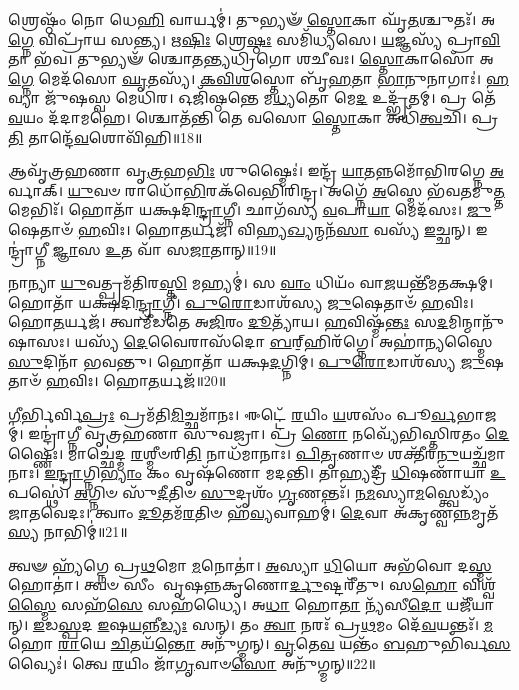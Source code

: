 𑌶𑍍𑌰𑍇𑌷𑍍𑌠𑌂᳴ 𑌨𑍋 𑌧𑍇\-\ul{𑌹𑌿} 𑌵𑌾𑌰𑍍𑌯𑌮𑍍॑।
𑌤𑍁𑌭𑍍𑌯𑍟᳴ \ul{𑌸𑍍𑌤𑍋}\-𑌕𑌾 𑌘𑍃᳴\-\ul{𑌤}\-𑌶𑍍𑌚𑍁𑌤𑌃᳴।
𑌅\-\ul{𑌗𑍍𑌨𑍇} 𑌵𑌿𑌪𑍍𑌰𑌾᳴𑌯 𑌸𑌨𑍍𑌤𑍍𑌯।
𑌋\-\ul{𑌷𑌿𑌃} 𑌶𑍍𑌰𑍇\-\ul{𑌷𑍍𑌠𑌃} 𑌸𑌮𑌿᳴𑌧𑍍𑌯𑌸𑍇।
\-\ul{𑌯}\-𑌜𑍍𑌞𑌸𑍍𑌯᳴ 𑌪𑍍𑌰𑌾\-\ul{𑌵𑌿}\-𑌤𑌾 𑌭᳴𑌵।
𑌤𑍁𑌭𑍍𑌯𑍟᳴ 𑌶𑍍𑌚𑍋𑌤𑌨𑍍𑌤𑍍𑌯𑌧𑍍𑌰𑌿𑌗𑍋 𑌶𑌚𑍀𑌵𑌃।
\-\ul{𑌸𑍍𑌤𑍋}\-𑌕𑌾𑌸𑍋᳴ 𑌅\-\ul{𑌗𑍍𑌨𑍇} 𑌮𑍇𑌦᳴𑌸𑍋 \ul{𑌘𑍃}\-𑌤𑌸𑍍𑌯᳴।
\-\ul{𑌕}\-\-\ul{𑌵𑌿}\-\-\ul{𑌶}\-𑌸𑍍𑌤𑍋 𑌬𑍃᳴\-\ul{𑌹}\-𑌤𑌾 \ul{𑌭𑌾}\-𑌨𑍁𑌨𑌾𑌗𑌾𑌃॑।
\-\ul{𑌹}\-𑌵𑍍𑌯𑌾 𑌜𑍁᳴𑌷𑌸𑍍𑌵 𑌮𑍇𑌧𑌿𑌰।
𑌓𑌜𑌿᳴𑌷𑍍𑌠𑌨𑍍𑌤𑍇 𑌮\-\ul{𑌧𑍍𑌯}\-𑌤𑍋 𑌮𑍇\-\ul{𑌦} 𑌉𑌦𑍍𑌭𑍃᳴𑌤𑌮𑍍।
𑌪𑍍𑌰 𑌤𑍇᳴ \ul{𑌵}\-𑌯𑌂 𑌦᳴𑌦𑌾𑌮𑌹𑍇।
𑌶𑍍𑌚𑍋𑌤᳴𑌨𑍍𑌤𑌿 𑌤𑍇 𑌵𑌸𑍋 \ul{𑌸𑍍𑌤𑍋}\-𑌕𑌾 𑌅𑌧𑌿᳴\-\ul{𑌤𑍍𑌵}\-𑌚𑌿।
𑌪𑍍𑌰\-\ul{𑌤𑌿} 𑌤𑌾𑌨𑍍𑌦𑍇᳴\-\ul{𑌵}\-𑌶𑍋𑌵𑌿᳴𑌹𑌿॥18॥\anuvakamend[\-\ul{𑌦𑍇}\-𑌵𑌵𑍀᳴𑌤\-\ul{𑌯} 𑌉𑌦𑍍𑌭𑍃᳴\-\ul{𑌤}\-𑌨𑍍𑌤𑍍𑌰𑍀𑌣𑌿᳴ 𑌚]

𑌆𑌵𑍃᳴𑌤𑍍𑌰𑌹𑌣𑌾 𑌵𑍃\-\ul{𑌤𑍍𑌰}\-𑌹\-\ul{𑌭𑌿𑌃} 𑌶𑍁𑌷𑍍𑌮𑍈𑌃॑।
𑌇𑌨𑍍𑌦𑍍𑌰᳴ \ul{𑌯𑌾}\-𑌤𑌨𑍍𑌨𑌮𑍋᳴𑌭𑌿𑌰𑌗𑍍𑌨𑍇 \ul{𑌅}\-𑌰𑍍𑌵𑌾𑌕𑍍।
\-\ul{𑌯𑍁}\-𑌵𑍞 𑌰𑌾𑌧𑍋᳴\-\ul{𑌭𑌿}\-𑌰𑌕᳴𑌵𑍇𑌭𑌿𑌰𑌿𑌨𑍍𑌦𑍍𑌰।
𑌅𑌗𑍍𑌨𑍇᳴ \ul{𑌅}\-𑌸𑍍𑌮𑍇 𑌭᳴𑌵𑌤𑌮𑍁\-\ul{𑌤𑍍𑌤}\-𑌮𑍇𑌭𑌿𑌃᳴।
𑌹𑍋𑌤𑌾᳴ 𑌯𑌕𑍍𑌷𑌦𑌿\-\ul{𑌨𑍍𑌦𑍍𑌰𑌾}\-𑌗𑍍𑌨𑍀।
𑌛𑌾𑌗᳴𑌸𑍍𑌯 \ul{𑌵}\-𑌪𑌾\-\ul{𑌯𑌾} 𑌮𑍇𑌦᳴𑌸𑌃।
\-\ul{𑌜𑍁}\-𑌷𑍇𑌤𑌾𑍞᳴ \ul{𑌹}\-𑌵𑌿𑌃।
𑌹𑍋\-\ul{𑌤}\-𑌰𑍍𑌯𑌜᳴।
𑌵𑌿𑌹𑍍𑌯\-\ul{𑌖𑍍𑌯}\-𑌨𑍍𑌮𑌨᳴\-\ul{𑌸𑌾} 𑌵𑌸𑍍𑌯᳴ \ul{𑌇}\-𑌚𑍍𑌛𑌨𑍍।
𑌇𑌨𑍍𑌦𑍍𑌰𑌾॑𑌗𑍍𑌨𑍀 \ul{𑌜𑍍𑌞𑌾}\-𑌸 \ul{𑌉}\-𑌤 𑌵𑌾᳴ 𑌸\-\ul{𑌜𑌾}\-𑌤𑌾𑌨𑍍॥19॥

𑌨𑌾𑌨𑍍𑌯𑌾 \ul{𑌯𑍁}\-𑌵𑌤𑍍𑌪𑍍𑌰𑌮᳴𑌤𑌿𑌰\-\ul{𑌸𑍍𑌤𑌿} 𑌮𑌹𑍍𑌯𑌮𑍍॑।
𑌸 \ul{𑌵𑌾𑌂} 𑌧𑌿𑌯𑌂᳴ 𑌵𑌾\-\ul{𑌜}\-𑌯𑌨𑍍𑌤𑍀᳴𑌮𑌤𑌕𑍍𑌷𑌮𑍍।
𑌹𑍋𑌤𑌾᳴ 𑌯𑌕𑍍𑌷𑌦𑌿\-\ul{𑌨𑍍𑌦𑍍𑌰𑌾}\-𑌗𑍍𑌨𑍀।
\-\ul{𑌪𑍁}\-\-\ul{𑌰𑍋}\-𑌡𑌾𑌶᳴𑌸𑍍𑌯 \ul{𑌜𑍁}\-𑌷𑍇𑌤𑌾𑍞᳴ \ul{𑌹}\-𑌵𑌿𑌃।
𑌹𑍋\-\ul{𑌤}\-𑌰𑍍𑌯𑌜᳴।
𑌤𑍍𑌵𑌾𑌮𑍀᳴𑌡𑌤𑍇 𑌅\-\ul{𑌜𑌿}\-𑌰𑌂 \ul{𑌦𑍂}\-𑌤𑍍𑌯𑌾᳴𑌯।
\-\ul{𑌹}\-𑌵𑌿𑌷𑍍𑌮᳴\-\ul{𑌨𑍍𑌤𑌃} 𑌸\-\ul{𑌦}\-𑌮𑌿𑌨𑍍𑌮𑌾𑌨𑍁᳴𑌷𑌾𑌸𑌃।
𑌯𑌸𑍍𑌯᳴ \ul{𑌦𑍇}\-𑌵𑍈𑌰𑌾𑌸᳴𑌦𑍋 \ul{𑌬}\-𑌰𑍍‌॒\mbox{}𑌹𑌿𑌰᳴𑌗𑍍𑌨𑍇।
𑌅𑌹𑌾॑𑌨𑍍𑌯𑌸𑍍𑌮𑍈 \ul{𑌸𑍁}\-𑌦𑌿𑌨𑌾᳴ 𑌭𑌵𑌨𑍍𑌤𑍁।
𑌹𑍋𑌤𑌾᳴ 𑌯𑌕𑍍𑌷\-\ul{𑌦}\-𑌗𑍍𑌨𑌿𑌮𑍍।
\-\ul{𑌪𑍁}\-\-\ul{𑌰𑍋}\-𑌡𑌾𑌶᳴𑌸𑍍𑌯 \ul{𑌜𑍁}\-𑌷𑌤𑌾𑍞᳴ \ul{𑌹}\-𑌵𑌿𑌃।
𑌹𑍋\-\ul{𑌤}\-𑌰𑍍𑌯𑌜᳴॥20॥\anuvakamend[\-\ul{𑌸}\-\-\ul{𑌜𑌾}\-𑌤𑌾\-\ul{𑌨}\-𑌗𑍍𑌨𑌿𑌨𑍍𑌦𑍍𑌵𑍇 𑌚᳴]

\-\ul{𑌗𑍀}\-𑌰𑍍𑌭𑌿𑌰𑍍𑌵𑌿\-\ul{𑌪𑍍𑌰𑌃} 𑌪𑍍𑌰𑌮᳴𑌤𑌿\-\ul{𑌮𑌿}\-𑌚𑍍𑌛𑌮𑌾᳴𑌨𑌃।
𑌈𑌟𑍍𑌟𑍇᳴ \ul{𑌰}\-𑌯𑌿𑌂 \ul{𑌯}\-𑌶𑌸𑌂᳴ 𑌪𑍂\-\ul{𑌰𑍍𑌵}\-𑌭𑌾𑌜𑌮𑍍॑।
𑌇𑌨𑍍𑌦𑍍𑌰𑌾॑𑌗𑍍𑌨𑍀 𑌵𑍃𑌤𑍍𑌰𑌹𑌣𑌾 𑌸𑍁𑌵𑌜𑍍𑌰𑌾।
𑌪𑍍𑌰 \ul{𑌣𑍋} 𑌨𑌵𑍍𑌯𑍇᳴𑌭𑌿𑌸𑍍𑌤𑌿𑌰𑌤𑌂 \ul{𑌦𑍇}\-𑌷𑍍𑌣𑍈𑌃।
𑌮𑌾𑌚𑍍𑌛𑍇॑𑌦𑍍𑌮 \ul{𑌰}\-𑌶𑍍𑌮𑍀𑍞𑌰𑌿\-\ul{𑌤𑌿} 𑌨𑌾𑌧᳴𑌮𑌾𑌨𑌾𑌃।
\-\ul{𑌪𑌿}\-\-\ul{𑌤𑍃}\-𑌣𑌾𑍞 𑌶𑌕𑍍𑌤𑍀᳴𑌰\-\ul{𑌨𑍁}\-\-𑌯𑌚𑍍𑌛᳴𑌮𑌾𑌨𑌾𑌃।
\-\ul{𑌇}\-\-\ul{𑌨𑍍𑌦𑍍𑌰𑌾}\-𑌗𑍍𑌨𑌿\-\ul{𑌭𑍍𑌯𑌾𑌂} 𑌕𑌂 𑌵𑍃𑌷᳴𑌣𑍋 𑌮𑌦𑌨𑍍𑌤𑌿।
𑌤𑌾𑌹𑍍𑌯𑌦𑍍𑌰𑍀᳴ \ul{𑌧𑌿}\-𑌷𑌣𑌾᳴𑌯𑌾 \ul{𑌉}\-𑌪𑌸𑍍𑌥𑍇॑।
\-\ul{𑌅}\-𑌗𑍍𑌨𑌿𑍞 𑌸𑍁᳴\-\ul{𑌦𑍀}\-𑌤𑌿𑍞 \ul{𑌸𑍁}\-𑌦𑍃𑌶𑌂᳴ \ul{𑌗𑍃}\-𑌣𑌨𑍍𑌤𑌃᳴।
\-\ul{𑌨}\-\-\ul{𑌮}\-𑌸𑍍𑌯𑌾\-\ul{𑌮}\-𑌸𑍍𑌤𑍍𑌵𑍇𑌡𑍍𑌯𑌂᳴ 𑌜𑌾𑌤𑌵𑍇𑌦𑌃।
𑌤𑍍𑌵𑌾𑌂 \ul{𑌦𑍂}\-𑌤𑌮᳴\-\ul{𑌰}\-𑌤𑌿𑍞 𑌹᳴\-\ul{𑌵𑍍𑌯}\-𑌵𑌾𑌹𑌮𑍍॑।
\-\ul{𑌦𑍇}\-𑌵𑌾 𑌅᳴𑌕𑍃𑌣𑍍𑌵\-\ul{𑌨𑍍𑌨}\-𑌮𑍃𑌤᳴\-\ul{𑌸𑍍𑌯} 𑌨𑌾𑌭𑌿𑌮𑍍॑॥21॥\anuvakamend[\-\ul{𑌜𑌾}\-\-\ul{𑌤}\-\-\ul{𑌵𑍇}\-\-\ul{𑌦𑍋} 𑌦𑍍𑌵𑍇 𑌚᳴]

𑌤𑍍𑌵𑍟 𑌹𑍍𑌯᳴𑌗𑍍𑌨𑍇 𑌪𑍍𑌰\-\ul{𑌥}\-𑌮𑍋 \ul{𑌮}\-𑌨𑍋𑌤𑌾॑।
\-\ul{𑌅}\-𑌸𑍍𑌯𑌾 \ul{𑌧𑌿}\-𑌯𑍋 𑌅𑌭᳴𑌵𑍋 𑌦\-\ul{𑌸𑍍𑌮}\-𑌹𑍋𑌤𑌾॑।
𑌤𑍍𑌵𑍞 𑌸𑍀𑌂 𑌵𑍃𑌷𑌨𑍍𑌨𑌕𑍃𑌣𑍋\-\ul{𑌰𑍍𑌦𑍁}\-𑌷𑍍𑌟𑌰𑍀᳴𑌤𑍁।
𑌸\-\ul{𑌹𑍋} 𑌵𑌿𑌶𑍍𑌵᳴\-\ul{𑌸𑍍𑌮𑍈} 𑌸𑌹᳴\-\ul{𑌸𑍇} 𑌸𑌹᳴𑌧𑍍𑌯𑍈।
𑌅\-\ul{𑌧𑌾} 𑌹𑍋\-\ul{𑌤𑌾} 𑌨𑍍𑌯᳴𑌸𑍀\-\ul{𑌦𑍋} 𑌯𑌜𑍀᳴𑌯𑌾𑌨𑍍।
\-\ul{𑌇}\-𑌡\-\ul{𑌸𑍍𑌪}\-𑌦 \ul{𑌇}\-𑌷\-\ul{𑌯}\-𑌨𑍍𑌨𑍀\-\ul{𑌡𑍍𑌯𑌃} 𑌸𑌨𑍍।
𑌤𑌂 \ul{𑌤𑍍𑌵𑌾} 𑌨𑌰𑌃᳴ 𑌪𑍍𑌰\-\ul{𑌥}\-𑌮𑌂 𑌦𑍇᳴\-\ul{𑌵}\-𑌯𑌨𑍍𑌤𑌃᳴।
\-\ul{𑌮}\-𑌹𑍋 \ul{𑌰𑌾}\-𑌯𑍇 \ul{𑌚𑌿}\-𑌤𑌯᳴\-\ul{𑌨𑍍𑌤𑍋} 𑌅𑌨𑍁᳴𑌗𑍍𑌮𑌨𑍍।
\-\ul{𑌵𑍃}\-𑌤𑍇\-\ul{𑌵} 𑌯𑌨𑍍𑌤𑌂᳴ \ul{𑌬}\-𑌹𑍁𑌭𑌿᳴𑌰𑍍𑌵\-\ul{𑌸}\-𑌵𑍍𑌯𑍈𑌃॑।
𑌤𑍍𑌵𑍇 \ul{𑌰}\-𑌯𑌿𑌂 𑌜𑌾᳴\-\ul{𑌗𑍃}\-𑌵𑌾𑍞\-\ul{𑌸𑍋} 𑌅𑌨𑍁᳴𑌗𑍍𑌮𑌨𑍍॥22॥

